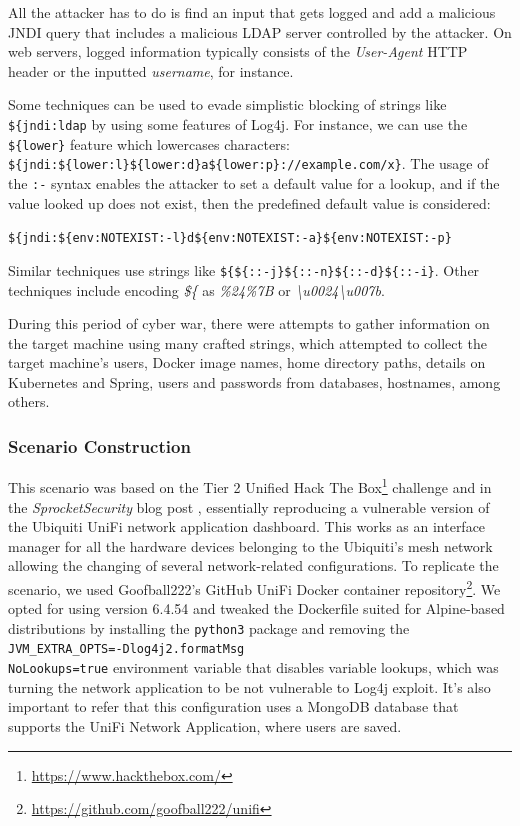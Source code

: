 All the attacker has to do is find an input that gets logged and add a malicious JNDI query that includes a malicious LDAP server controlled by the attacker. On web servers, logged information typically consists of the \textit{User-Agent} HTTP header or the inputted \textit{username}, for instance.

Some techniques can be used to evade simplistic blocking of strings like \texttt{\$\{jndi:ldap} by using some features of Log4j. For instance, we can use the \texttt{\$\{lower\}} feature which lowercases characters: \texttt{\$\{jndi:\$\{lower:l\}\$\{lower:d\}a\$\{lower:p\}://example.com/x\}}. The usage of the \texttt{:-} syntax enables the attacker to set a default value for a lookup, and if the value looked up does not exist, then the predefined default value is considered:

\texttt{\$\{jndi:\$\{env:NOTEXIST:-l\}d\$\{env:NOTEXIST:-a\}\$\{env:NOTEXIST:-p\}}


Similar techniques use strings like \texttt{\$\{\$\{::-j\}\$\{::-n\}\$\{::-d\}\$\{::-i\}}. Other techniques include encoding \textit{\$\{} as \textit{\%24\%7B} or \textit{\textbackslash u0024\textbackslash u007b}.

During this period of cyber war, there were attempts to gather information on the target machine using many crafted strings, which attempted to collect the target machine's users, Docker image names, home directory paths, details on Kubernetes and Spring, users and passwords from databases, hostnames, among others.

\subsubsection{Scenario Construction} \label{sec:validation_log4j_scenario_construction}

This scenario was based on the Tier 2 Unified Hack The Box\footnote{\url{https://www.hackthebox.com/}} challenge and in the \textit{SprocketSecurity} blog post \cite{sprocketsecurity_ref}, essentially reproducing a vulnerable version of the Ubiquiti UniFi network application dashboard. This works as an interface manager for all the hardware devices belonging to the Ubiquiti's mesh network allowing the changing of several network-related configurations. To replicate the scenario, we used Goofball222's GitHub UniFi Docker container repository\footnote{\url{https://github.com/goofball222/unifi}}. We opted for using version 6.4.54 and tweaked the Dockerfile suited for Alpine-based distributions by installing the \texttt{python3} package
and removing the \texttt{JVM\_EXTRA\_OPTS=-Dlog4j2.formatMsg\\NoLookups=true} environment variable that disables variable lookups, which was turning the network application to be not vulnerable to Log4j exploit. It's also important to refer that this configuration uses a MongoDB database that supports the UniFi Network Application, where users are saved.

